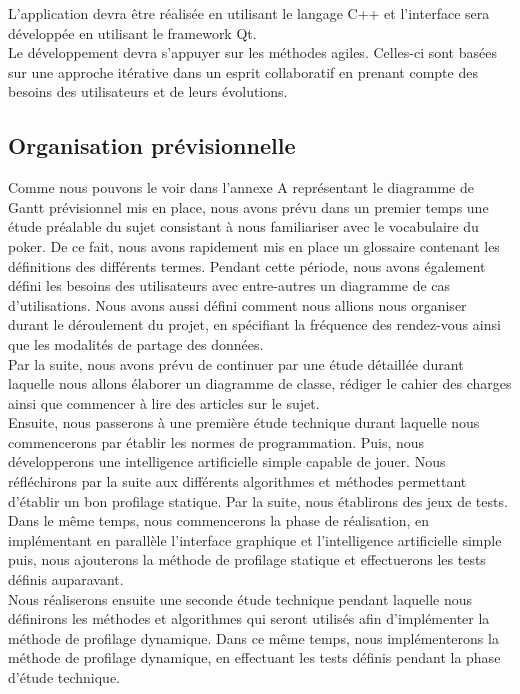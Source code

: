 \documentclass{report}
\begin{document}
L'application devra être réalisée en utilisant le langage C++ et l'interface sera développée en utilisant le framework Qt.\\

Le développement devra s'appuyer sur les méthodes agiles. Celles-ci sont basées sur une approche itérative dans un esprit collaboratif en prenant compte des besoins des utilisateurs et de leurs évolutions.\par

\subsection{Organisation prévisionnelle}

\hspace{0.5cm}Comme nous pouvons le voir dans l'annexe A représentant le diagramme de Gantt prévisionnel mis en place, nous avons prévu dans un premier temps une étude préalable du sujet consistant à nous familiariser avec le vocabulaire du poker. De ce fait, nous avons rapidement mis en place un glossaire contenant les définitions des différents termes. Pendant cette période, nous avons également défini les besoins des utilisateurs avec entre-autres un diagramme de cas d'utilisations. Nous avons aussi défini comment nous allions nous organiser durant le déroulement du projet, en spécifiant la fréquence des rendez-vous ainsi que les modalités de partage des données.\\

Par la suite, nous avons prévu de continuer par une étude détaillée durant laquelle nous allons élaborer un diagramme de classe, rédiger le cahier des charges ainsi que commencer à lire des articles sur le sujet.\\

Ensuite, nous passerons à une première étude technique durant laquelle nous commencerons par établir les normes de programmation. Puis, nous développerons une intelligence artificielle simple capable de jouer. Nous réfléchirons par la suite aux différents algorithmes et méthodes permettant d'établir un bon profilage statique. Par la suite, nous établirons des jeux de tests. Dans le même temps, nous commencerons la phase de réalisation, en implémentant en parallèle l'interface graphique et l'intelligence artificielle simple puis, nous ajouterons la méthode de profilage statique et effectuerons les tests définis auparavant.\\

Nous réaliserons ensuite une seconde étude technique pendant laquelle nous définirons les méthodes et algorithmes qui seront utilisés afin d'implémenter la méthode de profilage dynamique. Dans ce même temps, nous implémenterons la méthode de profilage dynamique, en effectuant les tests définis pendant la phase d'étude technique.\\
\end{document}
